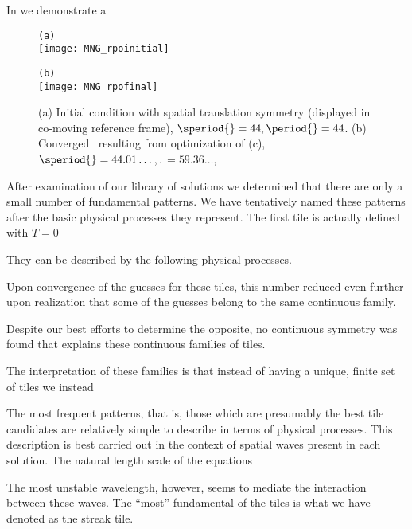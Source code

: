 In  we demonstrate a

\begin{figure}
\begin{minipage}[height=.05\textheight]{.5\textwidth}
\centering
\small{\texttt{(a)}} \\
\texttt{[image: MNG\_rpoinitial]}
\end{minipage}
\begin{minipage}[height=.2\textheight]{.5\textwidth}
\centering
\small{\texttt{(b)}} \\
\texttt{[image: MNG\_rpofinal]}
\end{minipage}
\caption{ \label{fig:rpo1}
(a) Initial condition with spatial translation symmetry
(displayed in co-moving reference frame),
$\speriod{}=44,\period{}=44$. (b) Converged \twot\ resulting from optimization
of (c), $\speriod{} = 44.01\dots$,$\period{}=59.36\dots$,}
\end{figure}


After examination of our library of solutions we determined that there are
only a small number of fundamental patterns. We have tentatively named
these patterns after the basic physical processes they represent.
The first tile is actually defined with $T=0$

They can be described by the
following physical processes.


Upon convergence of the
guesses for these tiles, this number reduced even further upon realization
that some of the guesses belong to the same continuous family.

Despite our best efforts to determine the opposite, no continuous symmetry
was found that explains these continuous families of tiles.

The interpretation of these families is that instead of having a unique, finite set of tiles
we instead

The most frequent patterns, that is, those which are presumably the best tile
candidates are relatively simple to describe in terms of physical processes.
This description is best carried out in the context of spatial waves present
in each solution. The natural length scale of the equations

The most unstable wavelength, however, seems to mediate the interaction between these
waves.
The ``most'' fundamental of the tiles is what we have denoted as the streak tile.



